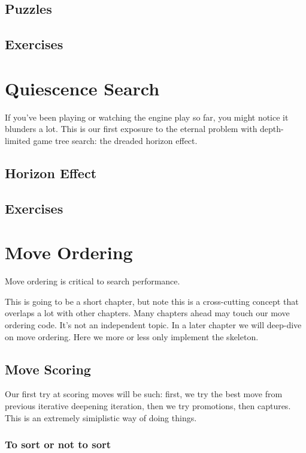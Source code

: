 \documentclass[letterpaper,11pt]{article}
\begin{document}
\subsection{Puzzles}
\subsection{Exercises}

\section{Quiescence Search}


If you've been playing or watching the engine play so far, you might notice it blunders a lot. This is our first 
exposure to the eternal problem with depth-limited game tree search: the dreaded horizon effect.

\subsection{Horizon Effect}

\subsection{Exercises}

\section{Move Ordering}
Move ordering is critical to search performance.

This is going to be a short chapter, 
but note this is a cross-cutting concept that overlaps a lot with other chapters.
Many chapters ahead may touch our move ordering code. It's not an independent topic.
In a later chapter we will deep-dive on move ordering. Here we more or less only 
implement the skeleton.

\subsection{Move Scoring}
Our first try at scoring moves will be such: first, we try the best move from previous iterative 
deepening iteration, then we try promotions, then captures. This is an extremely simiplistic way of doing 
things.

\subsubsection*{To sort or not to sort}
\end{document}

